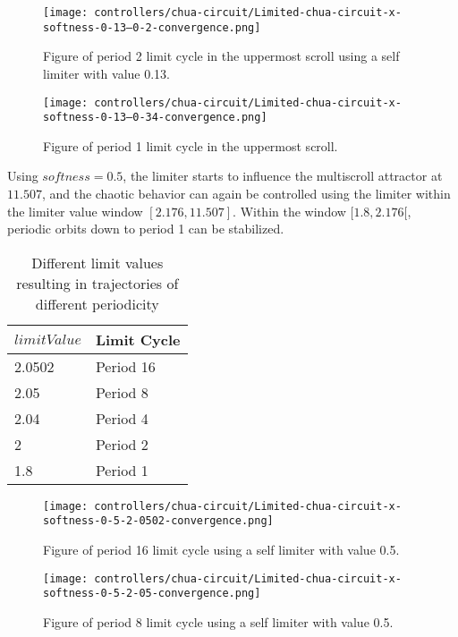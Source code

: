 \documentclass[main]{subfiles}
\begin{document}
\begin{figure}[H]
\centering
\texttt{[image: controllers/chua-circuit/Limited-chua-circuit-x-softness-0-13--0-2-convergence.png]}
\caption[Figure of period 3 limit cycle]{Figure of period 2 limit cycle in the uppermost scroll using a self limiter with value 0.13.}
\label{figure:x-0.13-2-limit-cycle-upperscroll-trajectory}
\end{figure}

\begin{figure}[H]
\centering
\texttt{[image: controllers/chua-circuit/Limited-chua-circuit-x-softness-0-13--0-34-convergence.png]}
\caption[Figure of period 1 limit cycle]{Figure of period 1 limit cycle in the uppermost scroll.}
\label{figure:x-0.13-1-limit-cycle-upperscroll-trajectory}
\end{figure}

Using \(softness=0.5\), the limiter starts to influence the multiscroll attractor at \(11.507\), and the chaotic behavior can again be controlled using the limiter within the limiter value window \([2.176,11.507]\). %
%
Within the window \([1.8,2.176[\), periodic orbits down to period 1 can be stabilized.

\begin{table}[H]
\renewcommand{\arraystretch}{1.2}
\center
\begin{tabular}{@{}ll@{}}
	\toprule
   \(limitValue\) & Limit Cycle\\
   \midrule
   2.0502 & Period 16 \\
   2.05 & Period 8 \\ 
   2.04 & Period 4 \\
   2  & Period 2 \\
   1.8 & Period 1 \\
   \bottomrule
\end{tabular}
\caption{Different limit values resulting in trajectories of different periodicity}
\label{table:x-0.5-lowermost-periodicities}
\end{table}

\begin{figure}[H]
\centering
\texttt{[image: controllers/chua-circuit/Limited-chua-circuit-x-softness-0-5-2-0502-convergence.png]}
\caption[Figure of period 16 limit cycle]{Figure of period 16 limit cycle using a self limiter with value 0.5.}
\label{figure:x-0.5-16-limit-cycle-trajectory}
\end{figure}

\begin{figure}[H]
\centering
\texttt{[image: controllers/chua-circuit/Limited-chua-circuit-x-softness-0-5-2-05-convergence.png]}
\caption[Figure of period 8 limit cycle]{Figure of period 8 limit cycle using a self limiter with value 0.5.}
\label{figure:x-0.5-8-limit-cycle-trajectory}
\end{figure}
\end{document}
